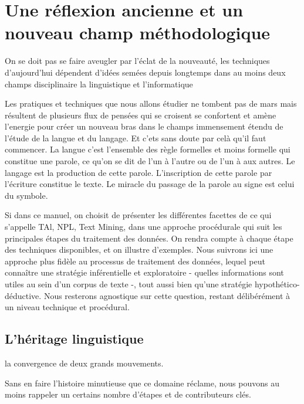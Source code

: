 \documentclass[
]{book}
\begin{document}
\hypertarget{une-ruxe9flexion-ancienne-et-un-nouveau-champ-muxe9thodologique}{%
\section{Une réflexion ancienne et un nouveau champ méthodologique}\label{une-ruxe9flexion-ancienne-et-un-nouveau-champ-muxe9thodologique}}

On se doit pas se faire aveugler par l'éclat de la nouveauté, les techniques d'aujourd'hui dépendent d'idées semées depuis longtemps dans au moins deux champs disciplinaire la linguistique et l'informatique

Les pratiques et techniques que nous allons étudier ne tombent pas de mars mais résultent de plusieurs flux de pensées qui se croisent se confortent et amène l'energie pour créer un nouveau bras dans le champs immensement étendu de l'étude de la langue et du langage. Et c'ets sans doute par celà qu'il faut commencer. La langue c'est l'ensemble des règle formelles et moins formelle qui constitue une parole, ce qu'on se dit de l'un à l'autre ou de l'un à aux autres. Le langage est la production de cette parole. L'inscription de cette parole par l'écriture constitue le texte. Le miracle du passage de la parole au signe est celui du symbole.

Si dans ce manuel, on choisit de présenter les différentes facettes de ce qui s'appelle TAl, NPL, Text Mining, dans une approche procédurale qui suit les principales étapes du traitement des données. On rendra compte à chaque étape des techniques disponibles, et on illustre d'exemples. Nous suivrons ici une approche plus fidèle au processus de traitement des données, lequel peut connaître une stratégie inférentielle et exploratoire - quelles informations sont utiles au sein d'un corpus de texte -, tout aussi bien qu'une stratégie hypothético-déductive. Nous resterons agnostique sur cette question, restant délibérément à un niveau technique et procédural.

\hypertarget{lhuxe9ritage-linguistique}{%
\subsection{L'héritage linguistique}\label{lhuxe9ritage-linguistique}}

la convergence de deux grands mouvements.

Sans en faire l'histoire minutieuse que ce domaine réclame, nous pouvons au moins rappeler un certains nombre d'étapes et de contributeurs clés.
\end{document}

